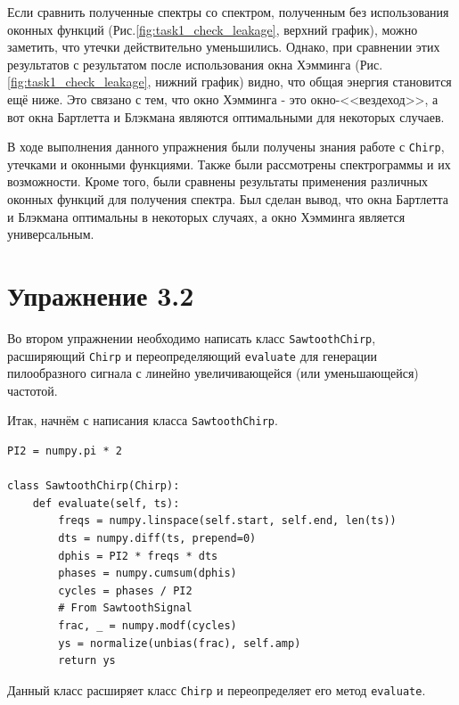 \documentclass[a4paper, 14pt]{extarticle}
\begin{document}
    Если сравнить полученные спектры со спектром, полученным без использования оконных функций
    (Рис.\ref{fig:task1_check_leakage}, верхний график), можно заметить, что утечки действительно уменьшились.
    Однако, при сравнении этих результатов с результатом после использования окна Хэмминга (Рис.\ref{fig:task1_check_leakage}, нижний график)
    видно, что общая энергия становится ещё ниже. Это связано с тем, что окно Хэмминга - это окно-<<вездеход>>, а вот
    окна Бартлетта и Блэкмана являются оптимальными для некоторых случаев.

    В ходе выполнения данного упражнения были получены знания работе с \texttt{Chirp}, утечками и оконными функциями.
    Также были рассмотрены спектрограммы и их возможности.
    Кроме того, были сравнены результаты применения различных оконных функций для получения спектра.
    Был сделан вывод, что окна Бартлетта и Блэкмана оптимальны в некоторых случаях, а окно Хэмминга является универсальным.

    \newpage

    \section{Упражнение 3.2}
    \label{sec:task2}

    Во втором упражнении необходимо написать класс \texttt{SawtoothChirp}, расширяющий \texttt{Chirp} и переопределяющий
    \texttt{evaluate} для генерации пилообразного сигнала с линейно увеличивающейся (или уменьшающейся) частотой.

    Итак, начнём с написания класса \texttt{SawtoothChirp}.

    \begin{lstlisting}[caption= Создание класса \texttt{SawtoothChirp}., label={lst:task2_create_class}]
PI2 = numpy.pi * 2

class SawtoothChirp(Chirp):
    def evaluate(self, ts):
        freqs = numpy.linspace(self.start, self.end, len(ts))
        dts = numpy.diff(ts, prepend=0)
        dphis = PI2 * freqs * dts
        phases = numpy.cumsum(dphis)
        cycles = phases / PI2
        # From SawtoothSignal
        frac, _ = numpy.modf(cycles)
        ys = normalize(unbias(frac), self.amp)
        return ys
    \end{lstlisting}

    Данный класс расширяет класс \texttt{Chirp} и переопределяет его метод \texttt{evaluate}.
\end{document}
